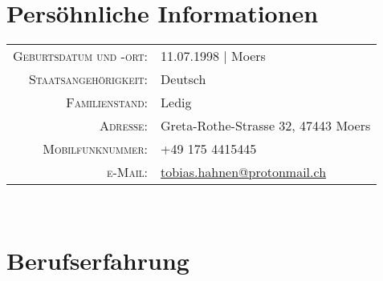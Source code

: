 \documentclass[10pt,a4paper]{article}
\begin{document}
%
%
\par{
	\bigskip\par
}


%
%
%
\section{Pers\"ohnliche Informationen}

\begin{tabular}{rl}
    \textsc{Geburtsdatum und -ort:}	& 11.07.1998 | Moers \\
    \textsc{Staatsangeh\"origkeit:}	& Deutsch \\
    \textsc{Familienstand:}			& Ledig \\
    \textsc{Adresse:}				& Greta-Rothe-Strasse 32, 47443 Moers \\
    \textsc{Mobilfunknummer:}		& +49 175 4415445 \\
    \textsc{e-Mail:}				& \href{mailto:tobias.hahnen@protonmail.ch}{tobias.hahnen@protonmail.ch}
\end{tabular} \\


\section{Berufserfahrung}
\end{document}
